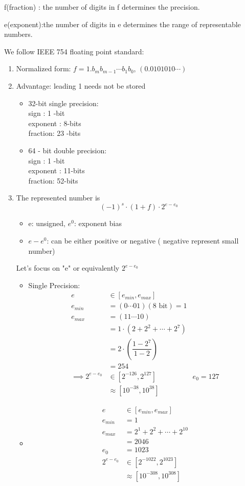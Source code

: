 \documentclass[10pt]{article}
\theoremstyle{definition}
\begin{document}
f(fraction) : the number of digits in f determines the precision.

e(exponent):the number of digits in e determines the range of representable numbers.

We follow IEEE 754 floating point standard:
\begin{enumerate}

\item Normalized form: $f = 1.b_m b_{m-1}\cdots b_1b_0$, 
$(0.0101010\cdots)$

\item
Advantage: leading 1 needs not be stored

\begin{itemize}
\item
 32-bit single precision: \\
 sign : 1 -bit \\
 exponent : 8-bits\\
 fraction: 23 -bits
 \item
 64 - bit double precision:\\
  sign : 1 -bit \\
 exponent : 11-bits\\
 fraction: 52-bits
\end{itemize}

\item
The represented number is \[(-1)^s\cdot (1+f)\cdot 2^{e-e_0}\]
\begin{itemize}
\item  e: unsigned, $e^0$: exponent bias
\item $e-e^0$: can be either positive or negative ( negative represent small number)
\end{itemize}
Let's focus on "e" or equivalently $2^{e-e_0}$
\begin{itemize}
\item Single Precision:
\begin{align*}
e &\in [e_{min}, e_{max}]\\
e_{min} &= (0\cdots 0 1)  (\text{8 bit}) =1\\ 
e_{max} &= (11\cdots 10)\\& = 1\cdot (2 + 2^2 +\cdots + 2^7)\\
&=2\cdot \left(\dfrac{1-2^7}{1-2}\right)\\
&=254\\
\implies 2^{e- e_0}& \in[2^{-126},2^{127}] &e_0 = 127\\&\approx [10^{-38},10^{38}]
\end{align*}
\item
\begin{align*}
e&\in [e_{min}, e_{max}]\\
e_{min}&=1\\
e_{max}&= 2^1+2^2+\cdots +2^{10}\\
&=2046\\
e_0 &=1023\\
2^{e-e_0}&\in [2^{-1022}, 2^{1023}]\\
&\approx[10^{-308}, 10^{308}]
\end{align*}
\end{itemize}


\end{enumerate}
\end{document}
